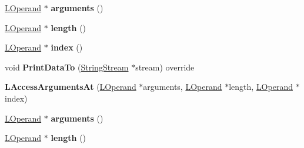 \begin{DoxyCompactItemize}
\item 
\hyperlink{classv8_1_1internal_1_1_l_operand}{L\+Operand} $\ast$ {\bfseries arguments} ()\hypertarget{classv8_1_1internal_1_1_l_access_arguments_at_a54eb42639fc35df69b3a3f57d7042ffd}{}\label{classv8_1_1internal_1_1_l_access_arguments_at_a54eb42639fc35df69b3a3f57d7042ffd}

\item 
\hyperlink{classv8_1_1internal_1_1_l_operand}{L\+Operand} $\ast$ {\bfseries length} ()\hypertarget{classv8_1_1internal_1_1_l_access_arguments_at_aca767dd582bd23265453d015e4cb3174}{}\label{classv8_1_1internal_1_1_l_access_arguments_at_aca767dd582bd23265453d015e4cb3174}

\item 
\hyperlink{classv8_1_1internal_1_1_l_operand}{L\+Operand} $\ast$ {\bfseries index} ()\hypertarget{classv8_1_1internal_1_1_l_access_arguments_at_a6d772ab178a18a50a3fa64dee0cab4c7}{}\label{classv8_1_1internal_1_1_l_access_arguments_at_a6d772ab178a18a50a3fa64dee0cab4c7}

\item 
void {\bfseries Print\+Data\+To} (\hyperlink{classv8_1_1internal_1_1_string_stream}{String\+Stream} $\ast$stream) override\hypertarget{classv8_1_1internal_1_1_l_access_arguments_at_a3027cb02e655a31d8f9264d10b49c7be}{}\label{classv8_1_1internal_1_1_l_access_arguments_at_a3027cb02e655a31d8f9264d10b49c7be}

\item 
{\bfseries L\+Access\+Arguments\+At} (\hyperlink{classv8_1_1internal_1_1_l_operand}{L\+Operand} $\ast$arguments, \hyperlink{classv8_1_1internal_1_1_l_operand}{L\+Operand} $\ast$length, \hyperlink{classv8_1_1internal_1_1_l_operand}{L\+Operand} $\ast$index)\hypertarget{classv8_1_1internal_1_1_l_access_arguments_at_a8b3a736e564c8f5337bf40bebffae277}{}\label{classv8_1_1internal_1_1_l_access_arguments_at_a8b3a736e564c8f5337bf40bebffae277}

\item 
\hyperlink{classv8_1_1internal_1_1_l_operand}{L\+Operand} $\ast$ {\bfseries arguments} ()\hypertarget{classv8_1_1internal_1_1_l_access_arguments_at_a54eb42639fc35df69b3a3f57d7042ffd}{}\label{classv8_1_1internal_1_1_l_access_arguments_at_a54eb42639fc35df69b3a3f57d7042ffd}

\item 
\hyperlink{classv8_1_1internal_1_1_l_operand}{L\+Operand} $\ast$ {\bfseries length} ()\hypertarget{classv8_1_1internal_1_1_l_access_arguments_at_aca767dd582bd23265453d015e4cb3174}{}\label{classv8_1_1internal_1_1_l_access_arguments_at_aca767dd582bd23265453d015e4cb3174}


\end{DoxyCompactItemize}
